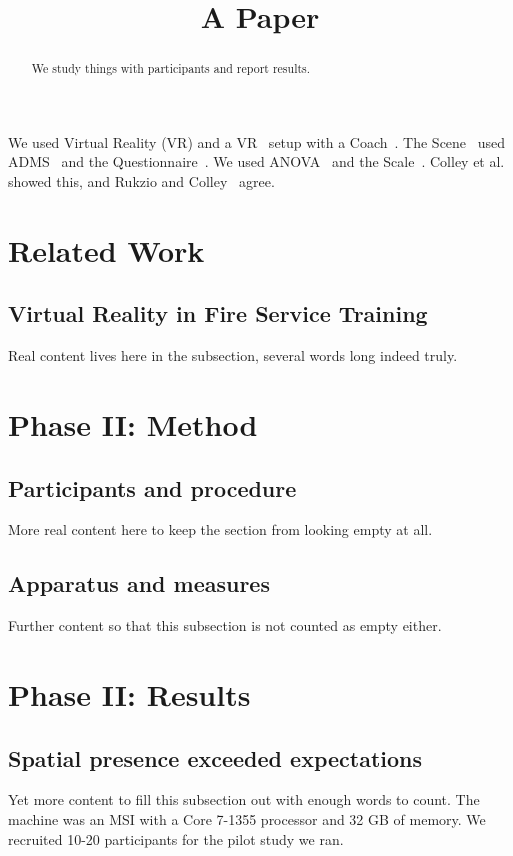 \documentclass[sigconf]{acmart}
\begin{document}
\title{A Paper}
\begin{abstract}We study things with participants and report results.\end{abstract}
\maketitle
We used Virtual Reality (VR) and a VR~\cite{a} setup with a Coach~\cite{b}.
The Scene~\cite{c} used ADMS~\cite{d} and the Questionnaire~\cite{e}.
We used ANOVA~\cite{f} and the Scale~\cite{g}.
Colley et al.~\cite{h} showed this, and Rukzio and Colley~\cite{i} agree.
\section{Related Work}\label{sec:rw}
\subsection{Virtual Reality in Fire Service Training}
Real content lives here in the subsection, several words long indeed truly.
\section{Phase II: Method}\label{sec:method}
\subsection{Participants and procedure}
More real content here to keep the section from looking empty at all.
\subsection{Apparatus and measures}
Further content so that this subsection is not counted as empty either.
\section{Phase II: Results}\label{sec:results}
\subsection{Spatial presence exceeded expectations}
Yet more content to fill this subsection out with enough words to count.
The machine was an MSI with a Core 7-1355 processor and 32 GB of memory.
We recruited 10-20 participants for the pilot study we ran.
\end{document}
